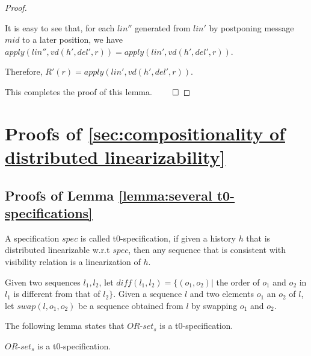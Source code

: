 {\begin {proof}
\begin{itemize}
    It is easy to see that, for each $\mathit{lin}''$ generated from $\mathit{lin}'$ by postponing message $\mathit{mid}$ to a later position, we have $\mathit{apply}(\mathit{lin}'',\mathit{vd}(h',\mathit{del}',r)) = \mathit{apply}(\mathit{lin}',\mathit{vd}(h',\mathit{del}',r))$.

    Therefore, $R'(r) = \mathit{apply}(\mathit{lin}',\mathit{vd}(h',\mathit{del}',r))$.
\end{itemize}

This completes the proof of this lemma. $\qed$
\end {proof}










\section{Proofs of \sectionautorefname \ref{sec:compositionality of distributed linearizability}}
\label{sec:appendix proofs of section compositionality of distributed linearizability}





\subsection{Proofs of Lemma \ref{lemma:several t0-specifications}}
\label{subsec:appendix proofs of Lemma several t0-specifications}

A specification $\mathit{spec}$ is called t0-specification, if given a history $h$ that is distributed linearizable w.r.t $\mathit{spec}$, then any sequence that is consistent with visibility relation is a linearization of $h$.

Given two sequences $l_1,l_2$, let $\mathit{diff}(l_1,l_2) = \{ (o_1,o_2) \vert$ the order of $o_1$ and $o_2$ in $l_1$ is different from that of $l_2 \}$. Given a sequence $l$ and two elements $o_1$ an $o_2$ of $l$, let $\mathit{swap}(l,o_1,o_2)$ be a sequence obtained from $l$ by swapping $o_1$ and $o_2$.

The following lemma states that $\mathit{OR}$-$\mathit{set}_s$ is a t0-specification.

\begin{lemma}
\label{lemma:or-set is a t0-specification}
$\mathit{OR}$-$\mathit{set}_s$ is a t0-specification.
\end{lemma}

}
